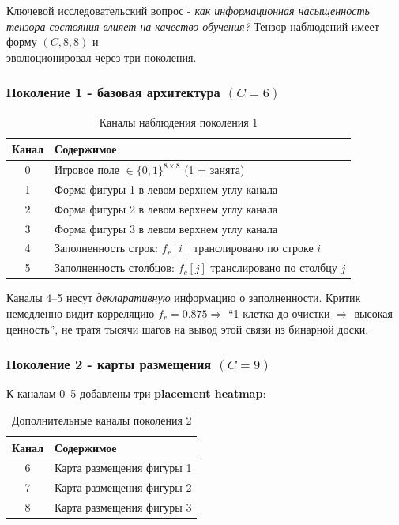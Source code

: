 \documentclass[12pt, a4paper]{article}
\begin{document}
Ключевой исследовательский вопрос - \textit{как информационная насыщенность тензора состояния влияет на качество обучения?} Тензор наблюдений имеет форму $(C, 8, 8)$ и \\ эволюционировал через три поколения.

\subsubsection{Поколение 1 - базовая архитектура $(C=6)$}

\begin{table}[H]
  \centering
  \caption{Каналы наблюдения поколения 1}
  \label{tab:obs_gen1}
  \begin{tabular}{cl}
    \toprule
    \textbf{Канал} & \textbf{Содержимое} \\
    \midrule
    0 & Игровое поле $\in\{0,1\}^{8\times 8}$ (1 = занята) \\
    1 & Форма фигуры 1 в левом верхнем углу канала \\
    2 & Форма фигуры 2 в левом верхнем углу канала \\
    3 & Форма фигуры 3 в левом верхнем углу канала \\
    4 & Заполненность строк: $f_r[i]$ транслировано по строке $i$ \\
    5 & Заполненность столбцов: $f_c[j]$ транслировано по столбцу $j$ \\
    \bottomrule
  \end{tabular}
\end{table}

Каналы 4--5 несут \textit{декларативную} информацию о заполненности. Критик немедленно видит корреляцию $f_r = 0.875 \Rightarrow$ ``1 клетка до очистки $\Rightarrow$ высокая ценность'', не тратя тысячи шагов на вывод этой связи из бинарной доски.

\subsubsection{Поколение 2 - карты размещения $(C=9)$}

К каналам 0--5 добавлены три \textbf{placement heatmap}:
\begin{table}[H]
  \centering
  \caption{Дополнительные каналы поколения 2}
  \label{tab:obs_gen2}
  \begin{tabular}{cl}
    \toprule
    \textbf{Канал} & \textbf{Содержимое} \\
    \midrule
    6 & Карта размещения фигуры 1 \\
    7 & Карта размещения фигуры 2 \\
    8 & Карта размещения фигуры 3 \\
    \bottomrule
  \end{tabular}
\end{table}
\end{document}
